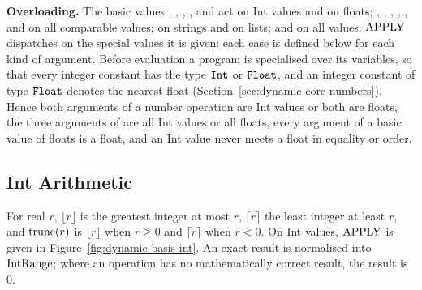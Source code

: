 \textbf{Overloading.} The basic values , , ,
,  and  act on Int values and on floats; ,
, , , ,  and  on all comparable
values;  on
strings and on lists;  and  on all values. $\mathrm{APPLY}$ dispatches
on the special values it is given: each case is defined below for each kind of
argument. Before evaluation a program is specialised over its 
variables, so that every integer constant has the type $\mathtt{Int}$ or $\mathtt{Float}$,
and an integer constant of type $\mathtt{Float}$ denotes the nearest float
(Section~\ref{sec:dynamic-core-numbers}). %
Hence both arguments of a number operation are Int values or both are floats,
the three arguments of  are all Int values or all floats, every
argument of a basic value of floats is a float, and an Int value never
meets a float in equality or order. %

\subsection{Int Arithmetic}\label{sec:appendix-dynamic-basis-intarith}

For real $r$, $\lfloor r\rfloor$ is the greatest integer at most $r$,
$\lceil r\rceil$ the least integer at least $r$, and $\mathrm{trunc}(r)$ is
$\lfloor r\rfloor$ when $r\geq 0$ and $\lceil r\rceil$ when $r<0$. On Int
values, $\mathrm{APPLY}$ is given in Figure~\ref{fig:dynamic-basis-int}. An exact
result is normalised into $\mathrm{IntRange}$; where an operation has no
mathematically correct result, the result is $0$. %

